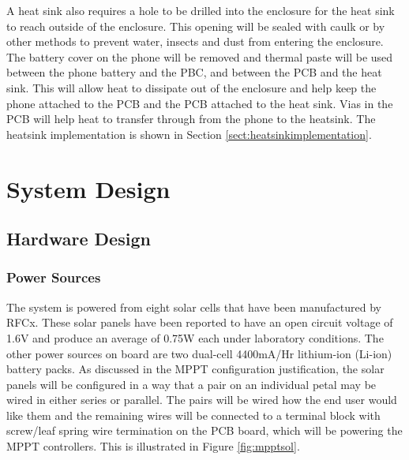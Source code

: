 \documentclass{article}
\numberwithin{figure}{section}
\numberwithin{equation}{section}
\begin{document}
{\bigskip
A heat sink also requires a hole to be drilled into the enclosure for the heat sink to reach outside of the enclosure. This opening will be sealed with caulk or by other methods to prevent water, insects and dust from entering the enclosure. The battery cover on the phone will be removed and thermal paste will be used between the phone battery and the PBC, and between the PCB and the heat sink. This will allow heat to dissipate out of the enclosure and help keep the phone attached to the PCB and the PCB attached to the heat sink. Vias in the PCB will help heat to transfer through from the phone to the heatsink. The heatsink implementation is shown in Section \ref{sect:heatsinkimplementation}.

\section{System Design} \label{sect:sysarch}
\subsection{Hardware Design} \label{sect:hardwaredesign}

\subsubsection{Power Sources}

The system is powered from eight solar cells that have been manufactured by RFCx. These solar panels have been reported to have an open circuit voltage of 1.6V and produce an average of 0.75W each under laboratory conditions. The other power sources on board are two dual-cell 4400mA/Hr lithium-ion (Li-ion) battery packs. As discussed in the MPPT configuration justification, the solar panels will be configured in a way that a pair on an individual petal may be wired in either series or parallel. The pairs will be wired how the end user would like them and the remaining wires will be connected to a terminal block with screw/leaf spring wire termination on the PCB board, which will be powering the MPPT controllers. This is illustrated in Figure \ref{fig:mpptsol}.

}
\end{document}
